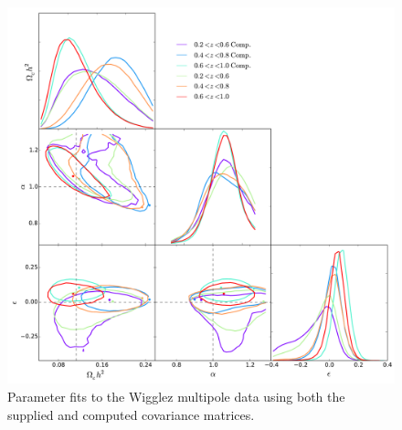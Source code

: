 \documentclass[titlesmallcaps, examinerscopy, copyrightpage]{uqthesis}
\begin{document}
\begin{appendices}
\begin{figure}[h!]
  \begin{center}
    \includegraphics[width=1\textwidth]{images/computedDiff.pdf}
  \end{center}
  \caption{Parameter fits to the Wigglez multipole data using both the supplied and computed covariance matrices.}
  \label{fig:DcomputedDiff}
\end{figure}



\end{appendices}


\end{document}
